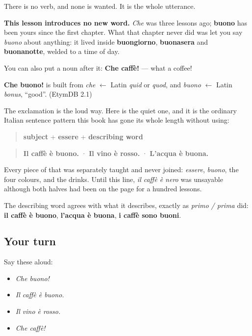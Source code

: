 There is no verb, and none is wanted. It is the whole utterance.

\textbf{This lesson introduces no new word.} \emph{Che} was three lessons ago; \textbf{buono} has been yours since the first chapter. What that chapter never did was let you say \emph{buono} about anything: it lived inside \textbf{buongiorno}, \textbf{buonasera} and \textbf{buonanotte}, welded to a time of day.

You can also put a noun after it: \textbf{Che caffè!} — what a coffee!

\begin{cousinweb}
\textbf{Che buono!} is built from \emph{che} $\leftarrow$ Latin \emph{quid} or \emph{quod}, and \emph{buono} $\leftarrow$ Latin \emph{bonus}, \textquotedblleft{}good\textquotedblright{}. (EtymDB 2.1)
\end{cousinweb}

\begin{grammarlens}[title={Grammar lens: an adjective after essere}]
The exclamation is the loud way. Here is the quiet one, and it is the ordinary Italian sentence pattern this book has gone its whole length without using:

\begin{quote}
\textbf{subject} + \textbf{essere} + \textbf{describing word}
\end{quote}

\begin{quote}
\textbf{Il caffè è buono.} · \textbf{Il vino è rosso.} · \textbf{L'acqua è buona.}
\end{quote}

Every piece of that was separately taught and never joined: \emph{essere}, \emph{buono}, the four colours, and the drinks. Until this line, \emph{il caffè è nero} was unsayable although both halves had been on the page for a hundred lessons.

The describing word agrees with what it describes, exactly as \emph{primo / prima} did: \textbf{il caffè è buono}, \textbf{l'acqua è buona}, \textbf{i caffè sono buoni}.
\end{grammarlens}

\subsection*{Your turn}
Say these aloud:

\begin{itemize}
\raggedright
  \item \emph{Che buono!}
  \item \emph{Il caffè è buono.}
  \item \emph{Il vino è rosso.}
  \item \emph{Che caffè!}
\end{itemize}

